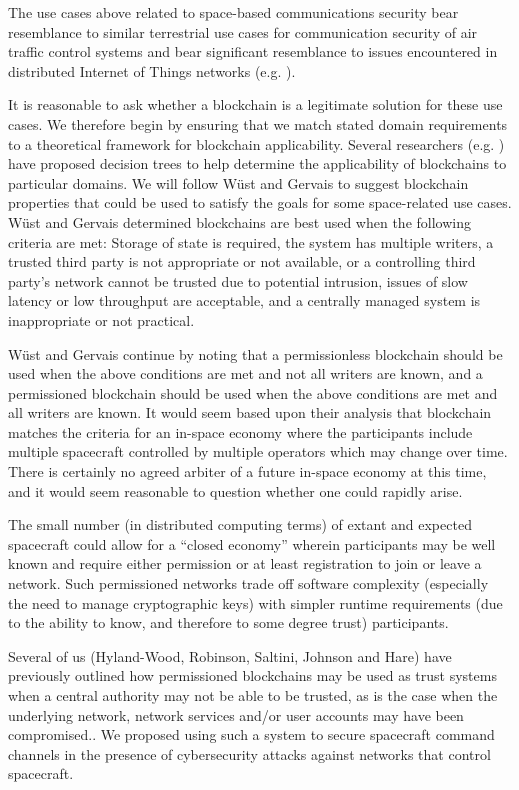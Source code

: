 \documentclass[]{aiaa-tc}%
\begin{document}
The use cases above related to space-based communications security bear resemblance to similar terrestrial use cases for communication security of air traffic control systems\cite{reisman_air_2019} and bear significant resemblance to issues encountered in distributed Internet of Things networks (e.g. \cite{dorri2017lsb, dorri2019mof}).

It is reasonable to ask whether a blockchain is a legitimate solution for these use cases. We therefore begin by ensuring that we match stated domain requirements to a theoretical framework for blockchain applicability. Several researchers (e.g. \cite{wust_gervais_2017,xu_design_2019}) have proposed decision trees to help determine the applicability of blockchains to particular domains. We will follow W\"{u}st and Gervais\cite{wust_gervais_2017} to suggest blockchain properties that could be used to satisfy the goals for some space-related use cases. W\"{u}st and Gervais determined blockchains are best used when the following criteria are met: Storage of state is required, the system has multiple writers, a trusted third party is not appropriate or not available, or a controlling third party's network cannot be trusted due to potential intrusion, issues of slow latency or low throughput are acceptable, and a centrally managed system is inappropriate or not practical.

W\"{u}st and Gervais continue by noting that a permissionless blockchain should be used when the above conditions are met and not all writers are known, and a permissioned blockchain should be used when the above conditions are met and all writers are known. It would seem based upon their analysis that blockchain matches the criteria for an in-space economy where the participants include multiple spacecraft controlled by multiple operators which may change over time. There is certainly no agreed arbiter of a future in-space economy at this time, and it would seem reasonable to question whether one could rapidly arise.

The small number (in distributed computing terms) of extant and expected spacecraft could allow for a ``closed economy'' wherein participants may be well known and require either permission or at least registration to join or leave a network. Such permissioned networks trade off software complexity (especially the need to manage cryptographic keys) with simpler runtime requirements (due to the ability to know, and therefore to some degree trust) participants.

Several of us (Hyland-Wood, Robinson, Saltini, Johnson and Hare) have previously outlined how permissioned blockchains may be used as trust systems when a central authority may not be able to be trusted, as is the case when the underlying network, network services and/or user accounts may have been compromised.\cite{hyland-wood-icssc2019}. We proposed using such a system to secure spacecraft command channels in the presence of cybersecurity attacks against networks that control spacecraft.
\end{document}
